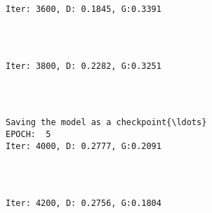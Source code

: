 \documentclass[11pt]{article}
\begin{document}
    \begin{Verbatim}[commandchars=\\\{\}]

Iter: 3600, D: 0.1845, G:0.3391
    \end{Verbatim}

    \begin{center}
    \end{center}
    { \hspace*{\fill} \\}
    
    \begin{Verbatim}[commandchars=\\\{\}]

Iter: 3800, D: 0.2282, G:0.3251
    \end{Verbatim}

    \begin{center}
    \end{center}
    { \hspace*{\fill} \\}
    
    \begin{Verbatim}[commandchars=\\\{\}]

Saving the model as a checkpoint{\ldots}
EPOCH:  5
Iter: 4000, D: 0.2777, G:0.2091
    \end{Verbatim}

    \begin{center}
    \end{center}
    { \hspace*{\fill} \\}
    
    \begin{Verbatim}[commandchars=\\\{\}]

Iter: 4200, D: 0.2756, G:0.1804
    \end{Verbatim}

    \begin{center}
    \end{center}
    { \hspace*{\fill} \\}
    
\end{document}
